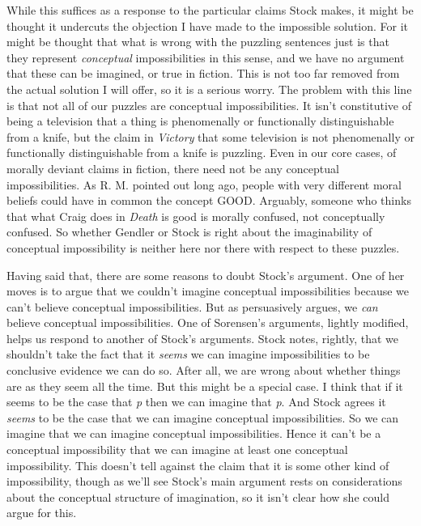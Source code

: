 While this suffices as a response to the particular claims Stock makes, it might be thought it undercuts the objection I have made to the impossible solution. For it might be thought that what is wrong with the puzzling sentences just is that they represent \textit{conceptual} impossibilities in this sense, and we have no argument that these can be imagined, or true in fiction. This is not too far removed from the actual solution I will offer, so it is a serious worry. The problem with this line is that not all of our puzzles are conceptual impossibilities. It isn't constitutive of being a television that a thing is phenomenally or functionally distinguishable from a knife, but the claim in \textit{Victory} that some television is not phenomenally or functionally distinguishable from a knife is puzzling. Even in our core cases, of morally deviant claims in fiction, there need not be any conceptual impossibilities. As R. M. \citet{Hare1951} pointed out long ago, people with very different moral beliefs could have in common the concept GOOD. Arguably, someone who thinks that what Craig does in \textit{Death} is good is morally confused, not conceptually confused. So whether Gendler or Stock is right about the imaginability of conceptual impossibility is neither here nor there with respect to these puzzles.

Having said that, there are some reasons to doubt Stock's argument. One of her moves is to argue that we couldn't imagine conceptual impossibilities because we can't believe conceptual impossibilities. But as \citet{Sorensen2001} persuasively argues, we \textit{can} believe conceptual impossibilities. One of Sorensen's arguments, lightly modified, helps us respond to another of Stock's arguments. Stock notes, rightly, that we shouldn't take the fact that it \textit{seems} we can imagine impossibilities to be conclusive evidence we can do so. After all, we are wrong about whether things are as they seem all the time. But this might be a special case. I think that if it seems to be the case that \textit{p} then we can imagine that \textit{p}. And Stock agrees it \textit{seems} to be the case that we can imagine conceptual impossibilities. So we can imagine that we can imagine conceptual impossibilities. Hence it can't be a conceptual impossibility that we can imagine at least one conceptual impossibility. This doesn't tell against the claim that it is some other kind of impossibility, though as we'll see Stock's main argument rests on considerations about the conceptual structure of imagination, so it isn't clear how she could argue for this.

